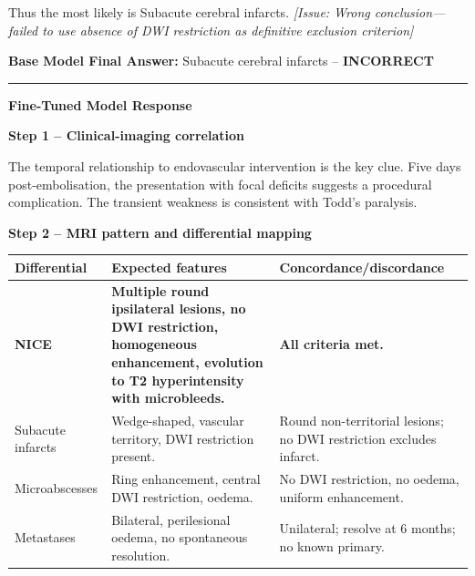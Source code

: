 \documentclass[10pt,journal,compsoc, onecolumn]{IEEEtran}
\begin{document}
\begin{casebox}
    \vspace{0.5em}
    Thus the most likely is Subacute cerebral infarcts. \textit{[Issue: Wrong conclusion---failed to use absence of DWI restriction as definitive exclusion criterion]}

    \vspace{1em}
    \noindent\textbf{Base Model Final Answer:} \colorbox{red!30}{Subacute cerebral infarcts} -- \textbf{INCORRECT}

    \vspace{1em}
    \hrule
    \vspace{1em}

    \textbf{Fine-Tuned Model Response}

    \vspace{0.5em}
    \noindent\textbf{Step 1 -- Clinical-imaging correlation}

    \colorbox{yellow!30}{The temporal relationship to endovascular intervention is the key clue}. Five days post-embolisation, the presentation with focal deficits suggests a procedural complication. The transient weakness is consistent with Todd's paralysis.

    \vspace{0.5em}
    \noindent\textbf{Step 2 -- MRI pattern and differential mapping}

    \renewcommand{\arraystretch}{1.4}
    \setlength{\tabcolsep}{6pt}
    {\footnotesize
    \begin{tabular}{|>{\raggedright\arraybackslash}p{2.5cm}|>{\raggedright\arraybackslash}p{4.2cm}|>{\raggedright\arraybackslash}p{5.0cm}|}
    \hline
    \textbf{Differential} & \textbf{Expected features} & \textbf{Concordance/discordance} \\
    \hline
    \textbf{NICE} & \textbf{Multiple round ipsilateral lesions, no DWI restriction, homogeneous enhancement, evolution to T2 hyperintensity with microbleeds.} & \textbf{All criteria met.} \\
    \hline
    Subacute infarcts & Wedge-shaped, vascular territory, DWI restriction present. & Round non-territorial lesions; \colorbox{yellow!30}{no DWI restriction excludes infarct}. \\
    \hline
    Microabscesses & Ring enhancement, central DWI restriction, oedema. & No DWI restriction, no oedema, uniform enhancement. \\
    \hline
    Metastases & Bilateral, perilesional oedema, no spontaneous resolution. & Unilateral; resolve at 6 months; no known primary. \\
    \hline
    \end{tabular}
    }


\end{casebox}
\end{document}
